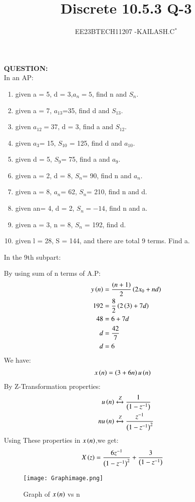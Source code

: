 \documentclass[journal,12pt,twocolumn]{IEEEtran}
\theoremstyle{remark}
\begin{document}

\vspace{3cm}

\title{Discrete 10.5.3 Q-3}
\author{EE23BTECH11207 -KAILASH.C$^{*}$%
}
\maketitle
\newpage
\bigskip

\renewcommand{\thefigure}{\theenumi}
\renewcommand{\thetable}{\theenumi}

\textbf{QUESTION:}\\
In an AP:
\begin{enumerate}
\item given a = 5, d = 3,$a_n=5$, find n and $S_n$.
\item given a = 7, $a_{13}$=35, find d and $S_{13}$.
\item given $a_{12}=37$, d = 3, find a and $S_{12}$.
\item given $a_3$= 15, $S_{10}$ = 125, find d and $a_{10}$.
\item given d = 5, $S_9$= 75, find a and $a_9$.
\item given a = 2, d = 8, $S_n$= 90, find n and $a_n$.
\item given a = 8, $a_n$= 62, $S_n$= 210, find n and d.
\item given an= 4, d = 2, $S_n=-14$, find n and a.
\item given a = 3, n = 8, $S_n$ = 192, find d.
\item given l = 28, S = 144, and there are total 9 terms. Find a.
\end{enumerate}
\solution 
In the 9th subpart:

By using sum of n terms of A.P:
\begin{align}
y\left(n\right)&=\frac{\left(n+1\right)}{2}\left(2x_0+nd\right)\label{eq:105331}\\
 192&=\frac{8}{2}\left(2\left(3\right)+7d\right)\label{eq:105332}\\
 48&=6+7d\label{eq:105533}\\
 d&=\frac{42}{7}\label{eq:105334}\\
 d&=6\label{eq:105335}
\end{align}
We have:
\begin{align}
    x\left(n\right)&=\left(3+6n\right)u\left(n\right)\label{eq:105336}
\end{align}
By Z-Transformation properties:
\begin{align}
u\left(n\right)&\xleftrightarrow[]{Z} \frac{1}{\left(1-z^{-1}\right)}\label{eq:105337}\\
    nu\left(n\right)&\xleftrightarrow[]{Z} \frac{z^{-1}}{\left(1-z^{-1}\right)^2}\label{eq:105338}
\end{align}
Using These properties in $x\left(n\right)$,we get:
\begin{align}
    X\left(z\right)&=\frac{6z^{-1}}{\left(1-z^{-1}\right)^2}+\frac{3}{\left(1-z^{-1}\right)}\label{eq:105339}
\end{align}
\begin{figure}[h]
        \centering
\texttt{[image: Graphimage.png]}
\caption{Graph of $x\left(n\right)$ vs n}
\label{fig:Fig10_5_3_3}
\end{figure}
\end{document}
